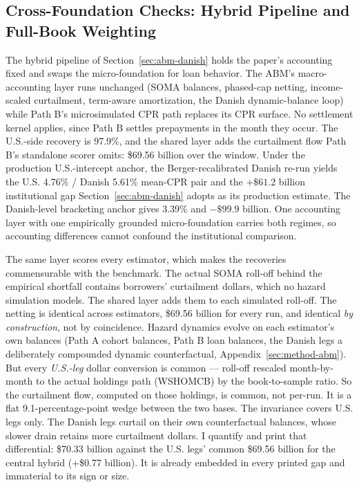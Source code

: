 \subsection{Cross-Foundation Checks: Hybrid Pipeline and Full-Book Weighting}\label{sec:robustness-hybrid}

The hybrid pipeline of Section~\ref{sec:abm-danish} holds the paper's accounting fixed and swaps the micro-foundation for loan behavior. The ABM's macro-accounting layer runs unchanged (SOMA balances, phased-cap netting, income-scaled curtailment, term-aware amortization, the Danish dynamic-balance loop) while Path B's microsimulated CPR path replaces its CPR surface. No settlement kernel applies, since Path B settles prepayments in the month they occur. The U.S.-side recovery is 97.9\%, and the shared layer adds the curtailment flow Path B's standalone scorer omits: \$69.56 billion over the window. Under the production U.S.-intercept anchor, the Berger-recalibrated Danish re-run yields the U.S. 4.76\% / Danish 5.61\% mean-CPR pair and the $+\$61.2$ billion institutional gap Section~\ref{sec:abm-danish} adopts as its production estimate. The Danish-level bracketing anchor gives 3.39\% and $-\$99.9$ billion. One accounting layer with one empirically grounded micro-foundation carries both regimes, so accounting differences cannot confound the institutional comparison.

The same layer scores every estimator, which makes the recoveries commensurable with the benchmark. The actual SOMA roll-off behind the empirical shortfall contains borrowers' curtailment dollars, which no hazard simulation models. The shared layer adds them to each simulated roll-off. The netting is identical across estimators, \$69.56 billion for every run, and identical \emph{by construction}, not by coincidence. Hazard dynamics evolve on each estimator's own balances (Path A cohort balances, Path B loan balances, the Danish legs a deliberately compounded dynamic counterfactual, Appendix~\ref{sec:method-abm}). But every \emph{U.S.-leg} dollar conversion is common --- roll-off rescaled month-by-month to the actual holdings path (WSHOMCB) by the book-to-sample ratio. So the curtailment flow, computed on those holdings, is common, not per-run. It is a flat 9.1-percentage-point wedge between the two bases. The invariance covers U.S. legs only. The Danish legs curtail on their own counterfactual balances, whose slower drain retains more curtailment dollars. I quantify and print that differential: \$70.33 billion against the U.S. legs' common \$69.56 billion for the central hybrid (+\$0.77 billion). It is already embedded in every printed gap and immaterial to its sign or size.

